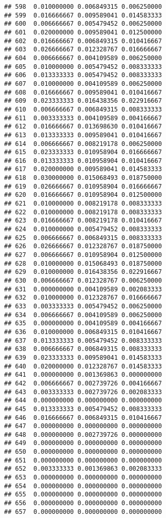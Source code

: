 \documentclass[
]{article}
\begin{document}
\begin{verbatim}
## 598  0.010000000 0.006849315 0.006250000
## 599  0.016666667 0.009589041 0.014583333
## 600  0.006666667 0.005479452 0.006250000
## 601  0.020000000 0.009589041 0.012500000
## 602  0.016666667 0.006849315 0.010416667
## 603  0.026666667 0.012328767 0.016666667
## 604  0.006666667 0.004109589 0.006250000
## 605  0.010000000 0.005479452 0.008333333
## 606  0.013333333 0.005479452 0.008333333
## 607  0.010000000 0.004109589 0.006250000
## 608  0.016666667 0.009589041 0.010416667
## 609  0.023333333 0.016438356 0.022916667
## 610  0.006666667 0.006849315 0.008333333
## 611  0.003333333 0.004109589 0.004166667
## 612  0.016666667 0.013698630 0.010416667
## 613  0.013333333 0.009589041 0.010416667
## 614  0.006666667 0.008219178 0.006250000
## 615  0.023333333 0.010958904 0.016666667
## 616  0.013333333 0.010958904 0.010416667
## 617  0.020000000 0.009589041 0.014583333
## 618  0.030000000 0.015068493 0.018750000
## 619  0.026666667 0.010958904 0.016666667
## 620  0.016666667 0.010958904 0.012500000
## 621  0.010000000 0.008219178 0.008333333
## 622  0.010000000 0.008219178 0.008333333
## 623  0.016666667 0.008219178 0.010416667
## 624  0.010000000 0.005479452 0.008333333
## 625  0.006666667 0.006849315 0.008333333
## 626  0.026666667 0.012328767 0.018750000
## 627  0.006666667 0.010958904 0.012500000
## 628  0.010000000 0.015068493 0.018750000
## 629  0.010000000 0.016438356 0.022916667
## 630  0.006666667 0.012328767 0.006250000
## 631  0.000000000 0.004109589 0.002083333
## 632  0.010000000 0.012328767 0.016666667
## 633  0.003333333 0.005479452 0.006250000
## 634  0.006666667 0.004109589 0.006250000
## 635  0.000000000 0.004109589 0.004166667
## 636  0.010000000 0.006849315 0.010416667
## 637  0.013333333 0.005479452 0.008333333
## 638  0.006666667 0.006849315 0.008333333
## 639  0.023333333 0.009589041 0.014583333
## 640  0.020000000 0.012328767 0.014583333
## 641  0.000000000 0.001369863 0.000000000
## 642  0.006666667 0.002739726 0.004166667
## 643  0.003333333 0.002739726 0.002083333
## 644  0.000000000 0.000000000 0.000000000
## 645  0.013333333 0.005479452 0.008333333
## 646  0.016666667 0.006849315 0.010416667
## 647  0.000000000 0.000000000 0.000000000
## 648  0.000000000 0.002739726 0.000000000
## 649  0.000000000 0.000000000 0.000000000
## 650  0.000000000 0.000000000 0.000000000
## 651  0.000000000 0.000000000 0.000000000
## 652  0.003333333 0.001369863 0.002083333
## 653  0.000000000 0.000000000 0.000000000
## 654  0.000000000 0.000000000 0.000000000
## 655  0.000000000 0.000000000 0.000000000
## 656  0.000000000 0.000000000 0.000000000
## 657  0.000000000 0.000000000 0.000000000

\end{verbatim}
\end{document}

